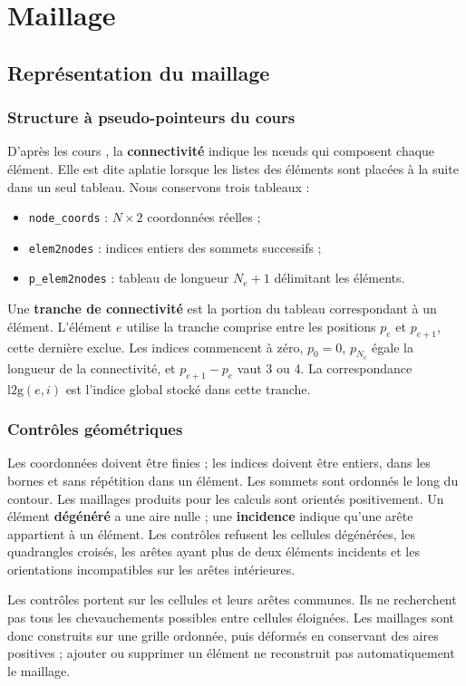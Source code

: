 \documentclass[12pt,a4paper]{article}
\begin{document}
\section{Maillage}
\subsection{Représentation du maillage}
\subsubsection{Structure à pseudo-pointeurs du cours}
D'après les cours \cite{structure,fem}, la \textbf{connectivité} indique les nœuds qui composent chaque élément. Elle est dite aplatie lorsque les listes des éléments sont placées à la suite dans un seul tableau. Nous conservons trois tableaux :
\begin{itemize}
\item \texttt{node\_\allowbreak coords} : $N\times2$ coordonnées réelles ;
\item \texttt{elem2nodes} : indices entiers des sommets successifs ;
\item \texttt{p\_\allowbreak elem2nodes} : tableau de longueur $N_e+1$ délimitant les éléments.
\end{itemize}
Une \textbf{tranche de connectivité} est la portion du tableau correspondant à un élément. L'élément $e$ utilise la tranche comprise entre les positions $p_e$ et $p_{e+1}$, cette dernière exclue. Les indices commencent à zéro, $p_0=0$, $p_{N_e}$ égale la longueur de la connectivité, et $p_{e+1}-p_e$ vaut 3 ou 4. La correspondance $\mathrm{l2g}(e,i)$ est l'indice global stocké dans cette tranche.

\subsubsection{Contrôles géométriques}
Les coordonnées doivent être finies ; les indices doivent être entiers, dans les bornes et sans répétition dans un élément. Les sommets sont ordonnés le long du contour. Les maillages produits pour les calculs sont orientés positivement. Un élément \textbf{dégénéré} a une aire nulle ; une \textbf{incidence} indique qu'une arête appartient à un élément. Les contrôles refusent les cellules dégénérées, les quadrangles croisés, les arêtes ayant plus de deux éléments incidents et les orientations incompatibles sur les arêtes intérieures.

Les contrôles portent sur les cellules et leurs arêtes communes. Ils ne recherchent pas tous les chevauchements possibles entre cellules éloignées. Les maillages sont donc construits sur une grille ordonnée, puis déformés en conservant des aires positives ; ajouter ou supprimer un élément ne reconstruit pas automatiquement le maillage.
\end{document}
